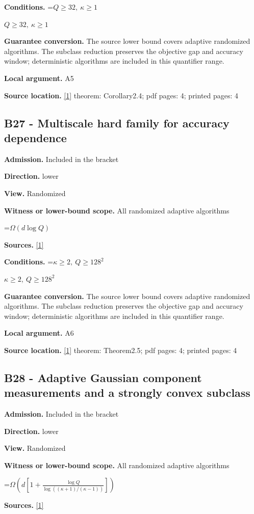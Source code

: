 \documentclass[10pt,a4paper]{article}
\newcommand{\AtlasMath}[1]{\par\begingroup\centering\setbox0=\hbox{$\displaystyle #1$}\ifdim\wd0>1.4\linewidth\typeout{ATLAS WIDE FORMULA: \the\wd0}\fi\ifdim\wd0>\linewidth\resizebox{\linewidth}{!}{\box0}\else\box0\fi\par\endgroup}
\newcommand{\AtlasInlineMath}[1]{\begingroup\setbox0=\hbox{$#1$}\ifdim\wd0>.4\linewidth\endgroup\AtlasMath{#1}\else\endgroup$#1$\fi}
\begin{document}
\textbf{Conditions.} \AtlasInlineMath{Q\ge32,\ \kappa\ge1}

\textbf{Guarantee conversion.} The source lower bound covers adaptive randomized algorithms. The subclass reduction preserves the objective gap and accuracy window; deterministic algorithms are included in this quantifier range.

\textbf{Local argument.} A5

\textbf{Source location.} \href{https://arxiv.org/html/2610.00345v1}{[1]} theorem: Corollary2.4; pdf pages: 4; printed pages: 4

\subsection{B27 - Multiscale hard family for accuracy dependence}
\textbf{Admission.} Included in the bracket

\textbf{Direction.} lower

\textbf{View.} Randomized

\textbf{Witness or lower-bound scope.} All randomized adaptive algorithms

\AtlasMath{\Omega(d\log Q)}
\textbf{Sources.} \href{https://arxiv.org/html/2610.00345v1}{[1]}

\textbf{Conditions.} \AtlasInlineMath{\kappa\ge2,\ Q\ge128^2}

\textbf{Guarantee conversion.} The source lower bound covers adaptive randomized algorithms. The subclass reduction preserves the objective gap and accuracy window; deterministic algorithms are included in this quantifier range.

\textbf{Local argument.} A6

\textbf{Source location.} \href{https://arxiv.org/html/2610.00345v1}{[1]} theorem: Theorem2.5; pdf pages: 4; printed pages: 4

\subsection{B28 - Adaptive Gaussian component measurements and a strongly convex subclass}
\textbf{Admission.} Included in the bracket

\textbf{Direction.} lower

\textbf{View.} Randomized

\textbf{Witness or lower-bound scope.} All randomized adaptive algorithms

\AtlasMath{\Omega\!\left(d\left[1+\frac{\log Q}{\log((\kappa+1)/(\kappa-1))}\right]\right)}
\textbf{Sources.} \href{https://arxiv.org/html/2610.00345v1}{[1]}
\end{document}
